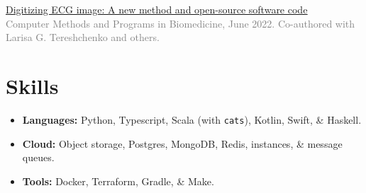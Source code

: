 \documentclass[12pt]{article} %
\providecommand{\tightlist}{%
  \setlength{\itemsep}{0pt}\setlength{\parskip}{0pt}}
\let\defaultref\href
\renewcommand{\href}[2]{%
  \defaultref{#1}{\ul{#2}}%
}
\renewcommand{\emph}[1]{%
  \textcolor{gray}{#1}%
}
\begin{document}
\href{https://doi.org/10.1101/2021.07.13.21260461}{Digitizing ECG image:
A new method and open-source software code}\\
\emph{Computer Methods and Programs in Biomedicine, June 2022.
Co-authored with Larisa G. Tereshchenko and others.}

\hypertarget{skills}{%
\section{Skills}\label{skills}}

\begin{itemize}
\tightlist
\item
  \textbf{Languages:} Python, Typescript, Scala (with \texttt{cats}),
  Kotlin, Swift, \& Haskell.
\item
  \textbf{Cloud:} Object storage, Postgres, MongoDB, Redis, instances,
  \& message queues.
\item
  \textbf{Tools:} Docker, Terraform, Gradle, \& Make.
\end{itemize}

\end{document}
